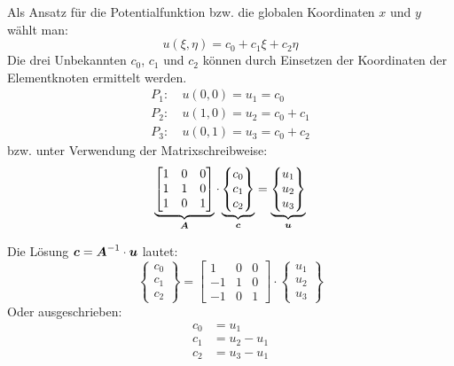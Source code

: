 Als Ansatz für die Potentialfunktion bzw. die globalen Koordinaten $x$ und $y$ wählt man:
\begin{equation}
 \label{eq:linear_triangle_eq}
u(\xi, \eta) = c_0 + c_1 \xi + c_2 \eta
\end{equation}
Die drei Unbekannten $c_0$, $c_1$ und $c_2$ können durch Einsetzen der Koordinaten der Elementknoten ermittelt werden. 
\begin{align}
P_1:&\ u(0,0) = u_1 = c_0\\
P_2:&\ u(1,0) = u_2 = c_0 + c_1 \nonumber \\
P_3:&\ u(0,1) = u_3 = c_0 + c_2 \nonumber
\end{align}
 bzw. unter Verwendung der Matrixschreibweise:
 \begin{equation}
 \label{eq:linear_triangle_matrix_eq}
 \underbrace{
 \begin{bmatrix}
 1 & 0 & 0 \\
 1 & 1 & 0 \\
 1 & 0 & 1
 \end{bmatrix}}_{\boldsymbol{A}} \cdot 
\underbrace{
 \begin{Bmatrix}
 c_0 \\ c_1 \\ c_2
 \end{Bmatrix}}_{\boldsymbol{c}} = 
\underbrace{
 \begin{Bmatrix}
 u_1 \\ u_2 \\ u_3
 \end{Bmatrix}}_{\boldsymbol{u}}
 \end{equation}
 
 Die Lösung $\boldsymbol{c} = \boldsymbol{A}^{-1}\cdot\boldsymbol{u}$ lautet:
 \begin{equation}
\begin{Bmatrix}
c_0 \\ c_1 \\ c_2
\end{Bmatrix} = 
\begin{bmatrix}
1 & 0 & 0 \\
-1 & 1 & 0 \\
-1 & 0 & 1
\end{bmatrix}
 \cdot 
 \begin{Bmatrix}
 	u_1 \\ u_2 \\ u_3
 \end{Bmatrix}
\end{equation}
Oder ausgeschrieben:
\begin{align}
	c_0 &= u_1 \\
	c_1 &= u_2 - u_1 \nonumber\\
	c_2 &= u_3 - u_1 \nonumber
\end{align}

